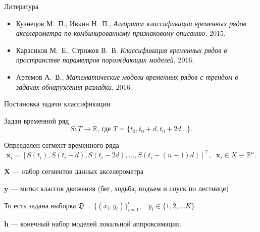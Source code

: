 \documentclass{beamer}
\newcommand{\bx}{\mathbf{x}}
\newcommand{\by}{\mathbf{y}}
\newcommand{\bX}{\mathbf{X}}
\newcommand{\bh}{\mathbf{h}}
\newcommand{\R}{\mathbb{R}}
\begin{document}
\begin{frame}{Литература}
\begin{itemize}
    \item Кузнецов М.~П., Ивкин Н.~П., \textit{Алгоритм классификации временных рядов акселерометра по комбинированному признаковому описанию}, 2015.
    \item Карасиков М.~Е., Стрижов В.~В. \textit{Классификация временных рядов в пространстве параметров порождающих моделей}, 2016.
    \item Артемов А.~В., \textit{Математические модели временных рядов с трендом в задачах обнаружения разладки}, 2016.
\end{itemize}
\end{frame}




\begin{frame}{Постановка задачи классификации}
    \begin{block}{Задан временной ряд}
    $$
    S: T \to \R \text{, где } T = \{t_0, t_0 + d, t_0 + 2d \ldots\}.
    $$
    \end{block}
    \begin{block}{Опрееделен сегмент временного ряда}%
    $$
    \bx_i  = [S(t_i), S(t_i - d), S(t_i - 2d), \ldots, S(t_i - (n - 1)d)]^\intercal,
\;\; \bx_i \in X \equiv \R^n.
    $$
    \end{block}
        $\bX$ — набор сегментов данных акселерометра

        $\by$ — метки классов движения (бег, ходьба, подъем и спуск по лестнице)

        То есть задана выборка $\mathfrak{D} = \{ (x_i, y_i) \}_{i=1}^l, \;\;\; y_i \in \{1, 2, \ldots K\}$

        $\bh$ — конечный набор моделей локальной аппроксимации.

\end{frame}

\end{document}
